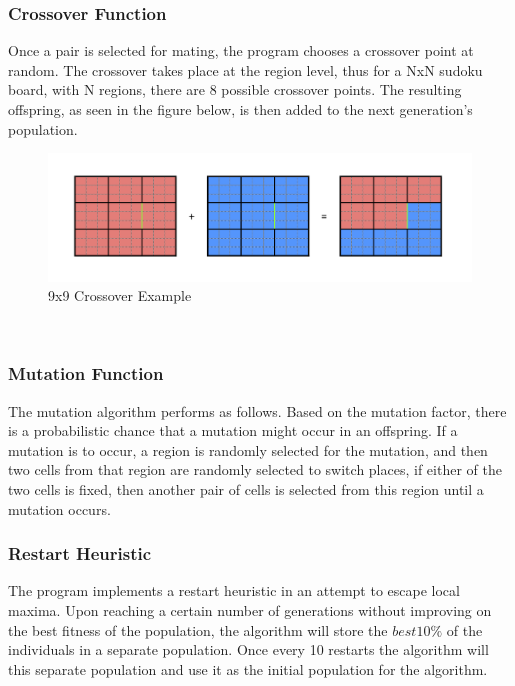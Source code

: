 \documentclass[12pt, a4paper]{article}
\begin{document}
			\subsubsection{Crossover Function}
			Once a pair is selected for mating, the program chooses a crossover point at random. The crossover takes place at the region level, thus for a NxN sudoku board, with N regions, there are 8 possible crossover points. The resulting offspring, as seen in the figure below, is then added to the next generation's population.
			\begin{figure}[h]
				\begin{center} 
					\includegraphics[width=6in]{Crossover.png}
					\caption{9x9 Crossover Example} 
					\label{fig:crossover}
				\end{center} 
			\end{figure}\\
			\subsubsection{Mutation Function}
			The mutation algorithm performs as follows. Based on the mutation factor, there is a probabilistic chance that a mutation might occur in an offspring. If a mutation is to occur, a region is randomly selected for the mutation, and then two cells from that region are randomly selected to switch places, if either of the two cells is fixed, then another pair of cells is selected from this region until a mutation occurs.
			\subsubsection{Restart Heuristic}
			The program implements a restart heuristic in an attempt to escape local maxima. Upon reaching a certain number of generations without improving on the best fitness of the population, the algorithm will store the $best 10\%$ of the individuals in a separate population. Once every 10 restarts the algorithm will this separate population and use it as the initial population for the algorithm.	
\end{document}
